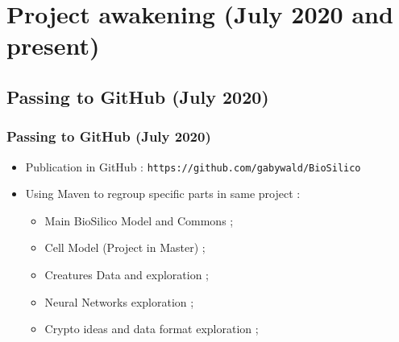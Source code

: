 \documentclass{beamer}
\begin{document}

\def\titleSectionThirdPart{Project awakening (July 2020 and present)}
\section{\titleSectionThirdPart }
\def\titleSubSectionThirdPartOne{ Passing to GitHub (July 2020) }
\subsection{ \titleSubSectionThirdPartOne }
\begin{frame}
	\frametitle{ \titleSubSectionThirdPartOne }
	\begin{itemize}
		\item Publication in GitHub : \texttt{https://github.com/gabywald/BioSilico}
		\item Using Maven to regroup specific parts in same project : 
		\begin{itemize}
			\item Main BioSilico Model and Commons ; 
			\item Cell Model (Project in Master) ; 
			\item Creatures Data and exploration ; 
			\item Neural Networks exploration ; 
			\item Crypto ideas and data format exploration ; 
		\end{itemize}
	\end{itemize}
\end{frame}

\def\titleSubSectionThirdPartTwo{ Implementations and Ideas to come }
\end{document}
